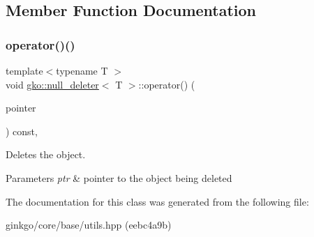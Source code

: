 \subsection{Member Function Documentation}
\mbox{\label{classgko_1_1null__deleter_a09fc153e500a30edaa572f2c6cb674ab}} 
\subsubsection{\texorpdfstring{operator()()}{operator()()}}
{\footnotesize\ttfamily template$<$typename T $>$ \\
void \hyperlink{classgko_1_1null__deleter}{gko\+::null\+\_\+deleter}$<$ T $>$\+::operator() (\begin{DoxyParamCaption}\item[{pointer}]{ }\end{DoxyParamCaption}) const\hspace{0.3cm}{\ttfamily [inline]}, {\ttfamily [noexcept]}}



Deletes the object. 


\begin{DoxyParams}{Parameters}
{\em ptr} & pointer to the object being deleted \\
\hline
\end{DoxyParams}


The documentation for this class was generated from the following file\+:\begin{DoxyCompactItemize}
\item 
ginkgo/core/base/utils.\+hpp (eebc4a9b)\end{DoxyCompactItemize}
